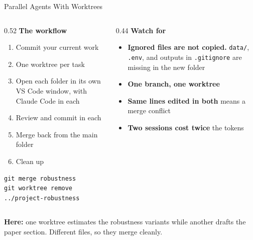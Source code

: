 \documentclass[aspectratio=169, 11pt]{beamer}
\begin{document}
\begin{frame}[fragile]{Parallel Agents With Worktrees}
  \begin{columns}[T]
    \begin{column}{0.52\textwidth}
      \textbf{The workflow}
      \begin{enumerate}
        \small
        \item Commit your current work
        \item One worktree per task
        \item Open each folder in its own VS Code window, with Claude Code in each
        \item Review and commit in each
        \item Merge back from the main folder
        \item Clean up
      \end{enumerate}
      \begin{lstlisting}[basicstyle=\ttfamily\scriptsize]
git merge robustness
git worktree remove ../project-robustness
      \end{lstlisting}
    \end{column}
    \begin{column}{0.44\textwidth}
      \textbf{Watch for}
      \begin{itemize}
        \small
        \item \textbf{Ignored files are not copied.} \texttt{data/}, \texttt{.env}, and outputs in \texttt{.gitignore} are missing in the new folder
        \item \textbf{One branch, one worktree}
        \item \textbf{Same lines edited in both} means a merge conflict \hyperlink{merge-conflicts}{}
        \item \textbf{Two sessions cost twice} the tokens
      \end{itemize}
    \end{column}
  \end{columns}

  \vspace{0.3em}
  {\small \textbf{Here:} one worktree estimates the robustness variants while another drafts the paper section. Different files, so they merge cleanly.}
\end{frame}
\end{document}

